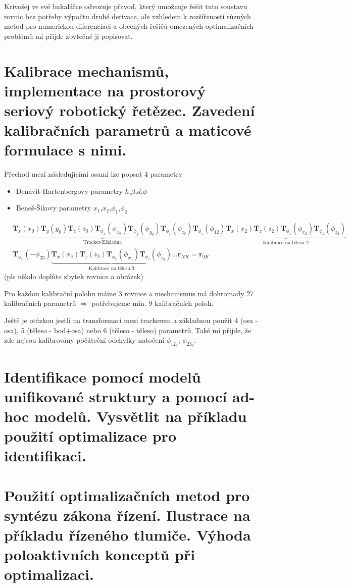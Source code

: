 \documentclass{article}
\begin{document}
	Krivošej ve své bakalářce odvozuje převod, který umožnuje řešit tuto soustavu rovnic bez potřeby výpočtu druhé derivace, ale vzhledem k rozšířenosti různých metod pro numerickou diferenciaci a obecných řešičů omezených optimalizačních problémů mi přijde zbytečné ji popisovat.

	\section{Kalibrace mechanismů, implementace na prostorový seriový robotický řetězec. Zavedení kalibračních parametrů a maticové formulace s nimi.}

	Přechod mezi následujícími osami lze popsat 4 parametry
	\begin{itemize}
		\item Denavit-Hartenbergovy parametry $h$,$\beta$,$d$,$\phi$
		\item Beneš-Šikovy parametry $x_1$,$x_2$,$\phi_1$,$\phi_2$
	\end{itemize}

	\begin{align}
		&\underbrace{
			\bm{T}_x(x_0)\bm{T}_y(y_0)\bm{T}_z(z_0)\bm{T}_{\phi_x}(\phi_{x_0})\bm{T}_{\phi_y}(\phi_{y_0})\bm{T}_{\phi_z}(\phi_{z_0})
		}_{\text{Tracker-Základna}}
		\bm{T}_{\phi_z}(\phi_{12})
		\underbrace{
			\bm{T}_x(x_2)\bm{T}_z(z_2)\bm{T}_{\phi_x}(\phi_{x_2})\bm{T}_{\phi_z}(\phi_{z_2})
		}_{\text{Kalibrace na tělesu 2}}\\&
		\bm{T}_{\phi_x}(-\phi_{23})
		\underbrace{
			\bm{T}_x(x_3)\bm{T}_z(z_3)\bm{T}_{\phi_x}(\phi_{x_3})\bm{T}_{\phi_z}(\phi_{z_3})
		}_{\text{Kalibrace na tělesu 3}}
		\ldots
		\bm{r}_{N K} = \bm{r}_{0K}
	\end{align}
	(pls někdo doplňte zbytek rovnice a obrázek)

	Pro každou kalibrační polohu máme 3 rovnice a mechanismus má dohromady 27 kalibračních parametrů $\Rightarrow$ potřebujeme min. 9 kalibračních poloh.

	Ještě je otázkou jestli na transformaci mezi trackerem a základnou použít 4 (osa - osa), 5 (těleso - bod+osa) nebo 6 (těleso - těleso) parametrů. Také mi přijde, že zde nejsou kalibrovány počáteční odchylky natočení $\phi_{12_0}$, $\phi_{23_0}$.

	\section{Identifikace pomocí modelů unifikované struktury a pomocí ad-hoc modelů. Vysvětlit na příkladu použití optimalizace pro identifikaci.}

	\section{Použití optimalizačních metod pro syntézu zákona řízení. Ilustrace na příkladu řízeného tlumiče. Výhoda poloaktivních konceptů při optimalizaci.}
\end{document}
